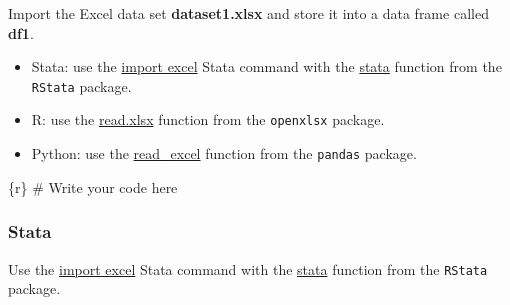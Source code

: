 \documentclass[
  letterpaper,
  DIV=11,
  numbers=noendperiod,
  oneside]{scrreprt}
\newenvironment{Shaded}{\begin{snugshade}}{\end{snugshade}}
\newcommand{\CommentTok}[1]{\textcolor[rgb]{0.37,0.37,0.37}{#1}}
\newcommand{\InformationTok}[1]{\textcolor[rgb]{0.37,0.37,0.37}{#1}}
\providecommand{\tightlist}{%
  \setlength{\itemsep}{0pt}\setlength{\parskip}{0pt}}\usepackage{longtable,booktabs,array}
\begin{document}
Import the Excel data set \textbf{dataset1.xlsx} and store it into a
data frame called \textbf{df1}.

\begin{tcolorbox}[enhanced jigsaw, colbacktitle=quarto-callout-tip-color!10!white, titlerule=0mm, breakable, opacityback=0, opacitybacktitle=0.6, left=2mm, coltitle=black, colback=white, title=\textcolor{quarto-callout-tip-color}{\faLightbulb}\hspace{0.5em}{Tip}, rightrule=.15mm, colframe=quarto-callout-tip-color-frame, toprule=.15mm, bottomtitle=1mm, toptitle=1mm, arc=.35mm, bottomrule=.15mm, leftrule=.75mm]

\begin{itemize}
\tightlist
\item
  Stata: use the
  \href{https://www.stata.com/manuals/dimportexcel.pdf}{import excel}
  Stata command with the
  \href{https://rdrr.io/github/lbraglia/RStata/man/stata.html}{stata}
  function from the \texttt{RStata} package.
\item
  R: use the
  \href{https://www.rdocumentation.org/packages/openxlsx/versions/4.2.5/topics/read.xlsx}{read.xlsx}
  function from the \texttt{openxlsx} package.
\item
  Python: use the
  \href{https://pandas.pydata.org/docs/reference/api/pandas.read_excel.html}{read\_excel}
  function from the \texttt{pandas} package.
\end{itemize}

\end{tcolorbox}

\begin{Shaded}
\begin{Highlighting}[]
\InformationTok{\textasciigrave{}\textasciigrave{}\textasciigrave{}\{r\}}
\CommentTok{\# Write your code here}
\InformationTok{\textasciigrave{}\textasciigrave{}\textasciigrave{}}
\end{Highlighting}
\end{Shaded}

\hypertarget{stata}{%
\subsubsection{Stata}\label{stata}}

Use the \href{https://www.stata.com/manuals/dimportexcel.pdf}{import
excel} Stata command with the
\href{https://rdrr.io/github/lbraglia/RStata/man/stata.html}{stata}
function from the \texttt{RStata} package.
\end{document}
